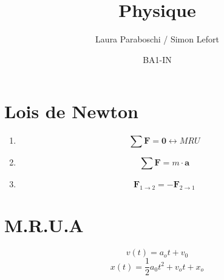 \documentclass{article}
\title{Physique}
\author{Laura Paraboschi / Simon Lefort}
\date{BA1-IN}
\begin{document}
\maketitle

\section{Lois de Newton}

\begin{enumerate}
    \item \[ \sum\textbf{F} = \textbf{0} \leftrightarrow MRU \] 
    \item \[ \sum\textbf{F} = m \cdot \textbf{a} \] 
    \item \[ \textbf{F}_{1 \rightarrow 2} = -\textbf{F}_{2 \rightarrow 1} \]
\end{enumerate}


\section{M.R.U.A}

\[ v(t) = a_ot + v_0 \]
\[ x(t) = \frac{1}{2}a_0t^2 + v_ot + x_o \]
\end{document}
